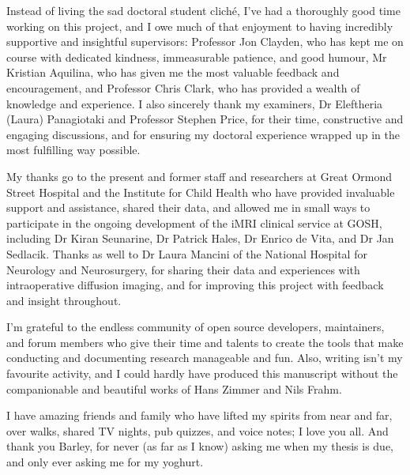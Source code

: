 \begin{acknowledgements}
  Instead of living the sad doctoral student cliché, I've had a thoroughly good time working on this project, and I owe much of that enjoyment to having incredibly supportive and insightful supervisors: Professor Jon Clayden, who has kept me on course with dedicated kindness, immeasurable patience, and good humour, Mr Kristian Aquilina, who has given me the most valuable feedback and encouragement, and Professor Chris Clark, who has provided a wealth of knowledge and experience.
  I also sincerely thank my examiners, Dr Eleftheria (Laura) Panagiotaki and Professor Stephen Price, for their time, constructive and engaging discussions, and for ensuring my doctoral experience wrapped up in the most fulfilling way possible.

  My thanks go to the present and former staff and researchers at Great Ormond Street Hospital and the Institute for Child Health who have provided invaluable support and assistance, shared their data, and allowed me in small ways to participate in the ongoing development of the iMRI clinical service at GOSH, including Dr Kiran Seunarine, Dr Patrick Hales, Dr Enrico de Vita, and Dr Jan Sedlacik. Thanks as well to Dr Laura Mancini of the National Hospital for Neurology and Neurosurgery, for sharing their data and experiences with intraoperative diffusion imaging, and for improving this project with feedback and insight throughout.

  I'm grateful to the endless community of open source developers, maintainers, and forum members who give their time and talents to create the tools that make conducting and documenting research manageable and fun. Also, writing isn't my favourite activity, and I could hardly have produced this manuscript without the companionable and beautiful works of Hans Zimmer and Nils Frahm.

  I have amazing friends and family who have lifted my spirits from near and far, over walks, shared TV nights, pub quizzes, and voice notes; I love you all. And thank you Barley, for never (as far as I know) asking me when my thesis is due, and only ever asking me for my yoghurt.
\end{acknowledgements}



\tableofcontents
\setcounter{tocdepth}{1}
\listoffigures
\listoftables
{
\setlength{\glsdescwidth}{0.8\linewidth}
\printglossary[type=\acronymtype,title={List of Abbreviations}]
}
